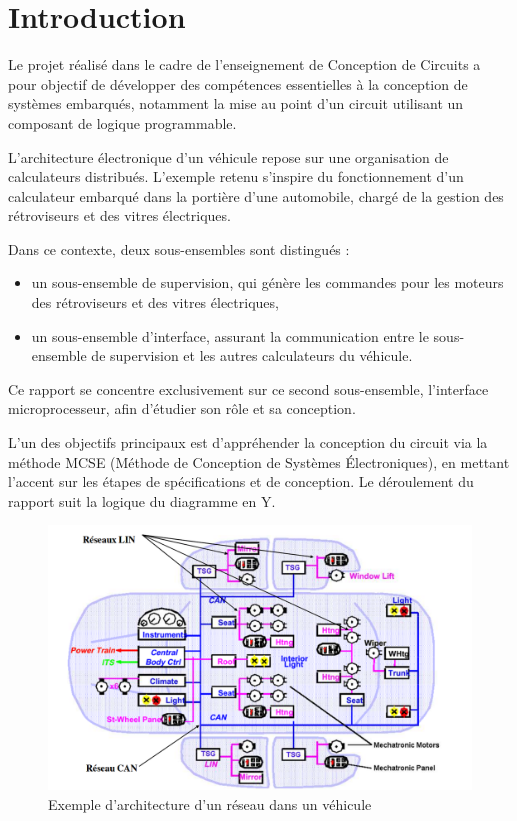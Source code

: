 \section{Introduction}

Le projet réalisé dans le cadre de l’enseignement de Conception de Circuits a pour objectif de développer des compétences essentielles à la conception de systèmes embarqués, notamment la mise au point d’un circuit utilisant un composant de logique programmable.
\newline

L’architecture électronique d’un véhicule repose sur une organisation de calculateurs distribués. L’exemple retenu s’inspire du fonctionnement d’un calculateur embarqué dans la portière d’une automobile, chargé de la gestion des rétroviseurs et des vitres électriques.
\newline

Dans ce contexte, deux sous-ensembles sont distingués : 
\begin{itemize}
    \item un sous-ensemble de supervision, qui génère les commandes pour les moteurs des rétroviseurs et des vitres électriques,
    \item un sous-ensemble d’interface, assurant la communication entre le sous-ensemble de supervision et les autres calculateurs du véhicule.
\end{itemize}

Ce rapport se concentre exclusivement sur ce second sous-ensemble, l’interface microprocesseur, afin d’étudier son rôle et sa conception.

L’un des objectifs principaux est d’appréhender la conception du circuit via la méthode MCSE (Méthode de Conception de Systèmes Électroniques), en mettant l’accent sur les étapes de spécifications et de conception. Le déroulement du rapport suit la logique du diagramme en Y.

\begin{figure}[H]
    \centering
    \includegraphics[width=0.8\linewidth]{images/Intro/Architecture_LIN.png}
    \caption{Exemple d’architecture d’un réseau dans un véhicule}
    \label{fig:placeholder}
\end{figure}